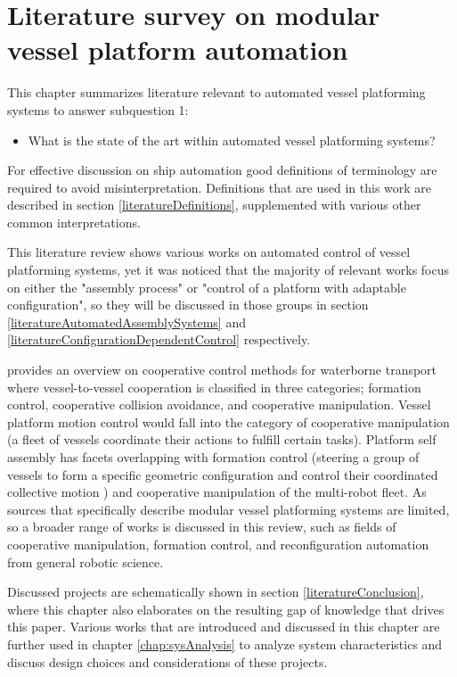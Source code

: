 \chapter{Literature survey on modular vessel platform automation}
\label{LiteratureStudy}

This chapter summarizes literature relevant to automated vessel platforming systems to answer subquestion 1:
\begin{itemize}
	\item What is the state of the art within automated vessel platforming systems?
\end{itemize}

For effective discussion on ship automation good definitions of terminology are required to avoid misinterpretation. Definitions that are used in this work are described in section \ref{literatureDefinitions}, supplemented with various other common interpretations. 

This literature review shows various works on automated control of vessel platforming systems, yet it was noticed that the majority of relevant works focus on either the "assembly process" or "control of a platform with adaptable configuration", so they will be discussed in those groups in section \ref{literatureAutomatedAssemblySystems} and \ref{literatureConfigurationDependentControl} respectively. 

\citet{chen2020survey} provides an overview on cooperative control methods for waterborne transport where  vessel-to-vessel cooperation is classified in three categories; formation control, cooperative collision avoidance, and cooperative manipulation. Vessel platform motion control would fall into the category of cooperative manipulation (a fleet of vessels coordinate their actions to fulfill certain tasks\cite{chen2020survey}). Platform self assembly has facets overlapping with formation control (steering a group of vessels to form a specific geometric configuration and control their coordinated collective motion \cite{chen2020survey}) and cooperative manipulation of the multi-robot fleet. As sources that specifically describe modular vessel platforming systems are limited, so a broader range of works is discussed in this review, such as fields of cooperative manipulation, formation control, and reconfiguration automation from general robotic science. 

Discussed projects are schematically shown in section \ref{literatureConclusion}, where this chapter also elaborates on the resulting gap of knowledge that drives this paper. Various works that are introduced and discussed in this chapter are further used in chapter \ref{chap:sysAnalysis} to analyze system characteristics and discuss design choices and considerations of these projects.

